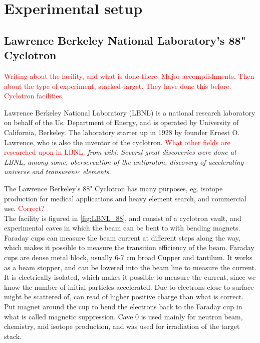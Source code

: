 \chapter{Experimental setup} \label{Experiment}




\section{Lawrence Berkeley National Laboratory's 88" Cyclotron} \label{sec:Cyclotron}
\noindent

\textcolor{red}{Writing about the facility, and what is done there. Major accomplishments. Then about the type of experiment, stacked-target. They have done this before. Cyclotron facilities. }

Lawrence Berkeley National Laboratory (LBNL) is a national research laboratory on behalf of the Us. Department of Energy, and is operated by University of California, Berkeley. The laboratory starter up in 1928 by founder Ernest O. Lawrence, who is also the inventor of the cyclotron. \textcolor{red}{What other fields are researched upon in LBNL.} \textit{from wiki: Several great discoveries were done at LBNL, among some, oberservation of the antiproton, discovery of accelerating universe and transuranic elements. }

\noindent
The Lawrence Berkeley's 88" Cyclotron has many purposes, eg. isotope production for medical applications and heavy element search, and commercial use.  \textcolor{red}{Correct?} \\

\noindent
The  facility is figured in \ref{fig:LBNL_88}, and consist of a cyclotron vault, and experimental caves in which the beam can be bent to with bending magnets. Faraday cups can measure the beam current at different steps along the way, which makes it possible to measure the transition efficiency of the beam. Faraday cups are dense metal block, usually 6-7 cm broad Cupper and tantilum. It works as a beam stopper, and can be lowered into the beam line to measure the current. It is electrically isolated, which makes it possible to measure the current, since we know the number of initial particles accelerated. Due to electrons close to surface might be scattered of, can read of higher positive charge than what is correct. Put magnet around the cup to bend the electrons back to the Faraday cup in what is called magnetic suppression.
\noindent
Cave 0 is used mainly for neutron beam, chemistry, and isotope production, and was used for irradiation of the target stack. 

